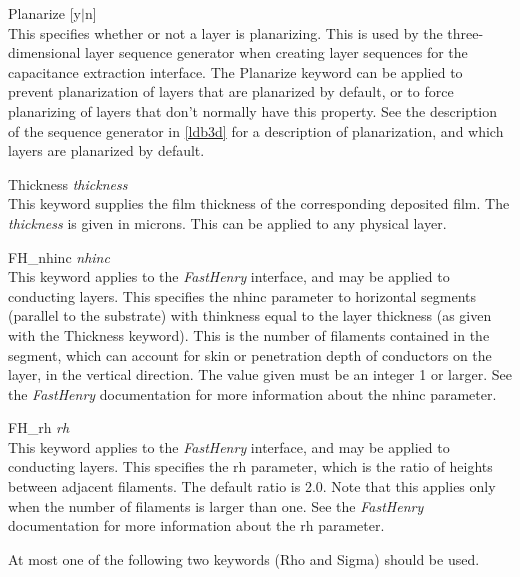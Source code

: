 \begin{description}
\item{\et Planarize} [{\vt y}$|${\vt n}]\\
This specifies whether or not a layer is planarizing.  This is used by
the three-dimensional layer sequence generator when creating layer
sequences for the capacitance extraction interface.  The {\vt
Planarize} keyword can be applied to prevent planarization of layers
that are planarized by default, or to force planarizing of layers that
don't normally have this property.  See the description of the
sequence generator in \ref{ldb3d} for a description of planarization,
and which layers are planarized by default.

\item{\et Thickness {\it thickness}}\\
This keyword supplies the film thickness of the corresponding
deposited film.  The {\it thickness} is given in microns.  This can be
applied to any physical layer.

\item{\et FH\_nhinc} {\it nhinc}\\
This keyword applies to the {\it FastHenry} interface, and may be
applied to conducting layers.  This specifies the {\vt nhinc}
parameter to horizontal segments (parallel to the substrate) with
thinkness equal to the layer thickness (as given with the {\et
Thickness} keyword).  This is the number of filaments contained in the
segment, which can account for skin or penetration depth of conductors
on the layer, in the vertical direction.  The value given must be an
integer 1 or larger.  See the {\it FastHenry} documentation for more
information about the {\vt nhinc} parameter.

\item{\et FH\_rh} {\it rh}\\
This keyword applies to the {\it FastHenry} interface, and may be
applied to conducting layers.  This specifies the {\vt rh} parameter,
which is the ratio of heights between adjacent filaments.  The default
ratio is 2.0.  Note that this applies only when the number of
filaments is larger than one.  See the {\it FastHenry} documentation
for more information about the {\vt rh} parameter.
\end{description}

At most one of the following two keywords ({\et Rho} and {\et Sigma})
should be used.

